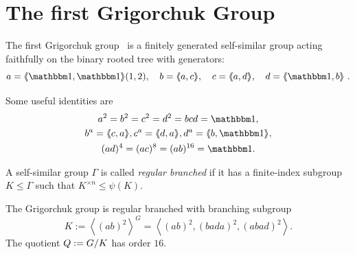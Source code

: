 \documentclass[a4paper,11pt]{amsart}
\begin{document}
\section{The first Grigorchuk Group}\label{sec:GrigorchukGroup}
The first Grigorchuk group~\cite{Grigorchuk:Burnside} is a finitely
generated self-similar group acting faithfully on the binary rooted
tree with generators:
\[a=\pair{\id,\id}(1,2),\quad b=\pair{a,c},\quad c=\pair{a,d},\quad d=\pair{\id,b}\ . \]

Some useful identities are
\begin{gather*}
  a^2=b^2=c^2=d^2=bcd=\id,\\
  b^a= \pair{c,a}, c^a=\pair{d,a}, d^a=\pair{b,\id},\\
  (ad)^4=(ac)^8=(ab)^{16}= \id.
\end{gather*}
\begin{defi}
 A self-similar group $\Gamma$ is called \emph{regular branched} if it
 has a finite-index subgroup $K\leq \Gamma$ such that $K^{\times n} \leq \psi(K)$.
\end{defi}
\begin{lem}\label{lem:subgroupK}
The Grigorchuk group is regular branched with branching subgroup 
 \[K:= \left<(ab)^2\right>^G=\left< (ab)^2,(bada)^2,(abad)^2 \right>. \]
 The quotient $Q := {G/K}$ has order $16$.
\end{lem}
\end{document}
